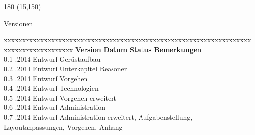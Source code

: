 
\begin{textblock}{180} (15,150)
\color{black}
\begin{huge}
Versionen
\end{huge}
\vspace{10mm}

\fontsize{10pt}{18pt}\selectfont
\begin{tabbing}
xxxxxxxxxxx\=xxxxxxxxxxxxxxx\=xxxxxxxxxxxxxx\=xxxxxxxxxxxxxxxxxxxxxxxxxxxxxxxxxxxxxxxxxxxxxxx \kill
\textbf{Version}	\> \textbf{Datum}	\> \textbf{Status}		\> \textbf{Bemerkungen}		\\
0.1	.2014	\> Entwurf		\> Gerüstaufbau	\\	
0.2	.2014	\> Entwurf		\> Unterkapitel Reasoner	\\	
0.3	.2014	\> Entwurf		\> Vorgehen	\\	
0.4	.2014	\> Entwurf		\> Technologien	\\
0.5	.2014	\> Entwurf		\> Vorgehen erweitert	\\	
0.6	.2014	\> Entwurf		\> Administration	\\ 
0.7	.2014	\> Entwurf		\> Administration erweitert, Aufgabenstellung, \\
    \>              \>              \> Layoutanpassungen, Vorgehen, Anhang \\
\end{tabbing}

\end{textblock}
